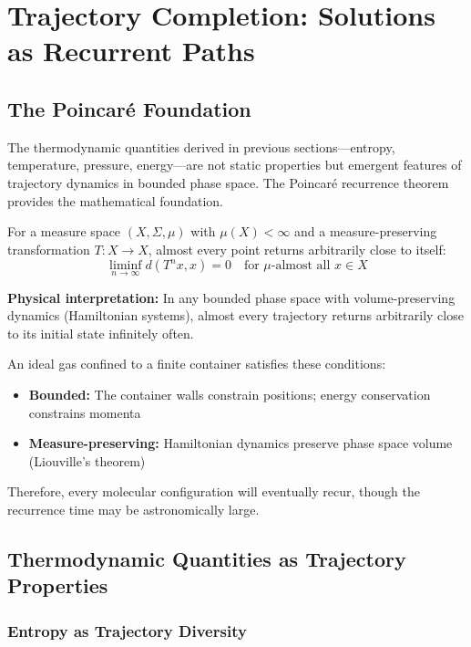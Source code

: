 \section{Trajectory Completion: Solutions as Recurrent Paths}
\label{sec:trajectory}

\subsection{The Poincaré Foundation}

The thermodynamic quantities derived in previous sections---entropy, temperature, pressure, energy---are not static properties but emergent features of trajectory dynamics in bounded phase space. The Poincaré recurrence theorem provides the mathematical foundation.

\begin{theorem}
\label{thm:poincare_recurrence}
For a measure space $(X, \Sigma, \mu)$ with $\mu(X) < \infty$ and a measure-preserving transformation $T: X \to X$, almost every point returns arbitrarily close to itself:
\begin{equation}
\liminf_{n \to \infty} d(T^n x, x) = 0 \quad \text{for } \mu\text{-almost all } x \in X
\end{equation}
\end{theorem}

\textbf{Physical interpretation:} In any bounded phase space with volume-preserving dynamics (Hamiltonian systems), almost every trajectory returns arbitrarily close to its initial state infinitely often.

An ideal gas confined to a finite container satisfies these conditions:
\begin{itemize}
\item \textbf{Bounded:} The container walls constrain positions; energy conservation constrains momenta
\item \textbf{Measure-preserving:} Hamiltonian dynamics preserve phase space volume (Liouville's theorem)
\end{itemize}

Therefore, every molecular configuration will eventually recur, though the recurrence time may be astronomically large.

\subsection{Thermodynamic Quantities as Trajectory Properties}

\subsubsection{Entropy as Trajectory Diversity}

